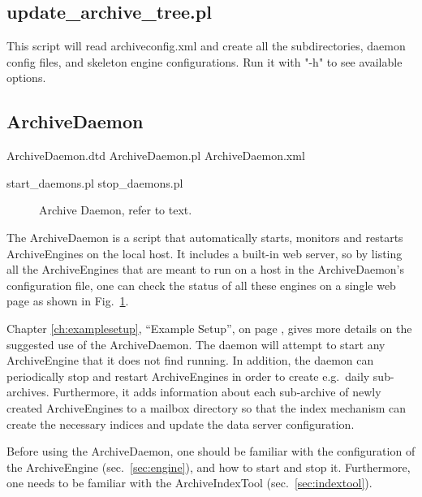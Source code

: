 \subsection{update\_archive\_tree.pl}
This script will read archiveconfig.xml and create all the subdirectories,
daemon config files, and skeleton engine configurations.
Run it with "-h" to see available options.

\subsection{ArchiveDaemon} \label{sec:daemon}
ArchiveDaemon.dtd
ArchiveDaemon.pl
ArchiveDaemon.xml

start\_daemons.pl
stop\_daemons.pl

\begin{figure}[htb]
\begin{center}
\end{center}
\caption{\label{fig:daemon}Archive Daemon, refer to text.}
\end{figure}

\noindent The ArchiveDaemon is a script that automatically starts,
monitors and restarts ArchiveEngines on the local host. It includes a
built-in web server, so by listing all the ArchiveEngines that are
meant to run on a host in the ArchiveDaemon's configuration file, one
can check the status of all these engines on a single web page as
shown in Fig.~\ref{fig:daemon}.

Chapter \ref{ch:examplesetup}, ``Example Setup'', on page
\pageref{ch:examplesetup}, gives more details on the suggested use of
the ArchiveDaemon. The daemon will attempt to start any ArchiveEngine
that it does not find running. In addition, the daemon can
periodically stop and restart ArchiveEngines in order to create
e.g.\ daily sub-archives.  Furthermore, it adds information about
each sub-archive of newly created ArchiveEngines to a mailbox directory
so that the index mechanism can create the necessary indices
and update the data server configuration.

Before using the ArchiveDaemon, one should be familiar
with the configuration of the ArchiveEngine (sec.\ \ref{sec:engine}),
and how to start and stop it. Furthermore, one needs to be familiar
with the ArchiveIndexTool (sec.\ \ref{sec:indextool}).

